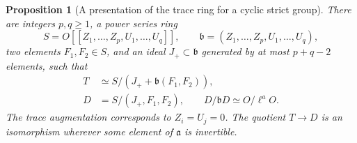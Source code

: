 \documentclass[a4paper,11pt]{article}
\newtheorem{proposition}{Proposition}[section]
\theoremstyle{definition}
\theoremstyle{remark}
\numberwithin{equation}{section}
\begin{document}
\begin{proposition}[A presentation of the trace ring for a cyclic strict group]
\label{prop:cyclictrace397}
There are integers \(p,q\ge1\), a power series ring
\[
 S=O[[Z_1,\ldots,Z_p,U_1,\ldots,U_q]],\qquad
 \mathfrak b=(Z_1,\ldots,Z_p,U_1,\ldots,U_q),
\]
two elements \(F_1,F_2\in S\), and an ideal
\(J_+\subset\mathfrak b\) generated by at most \(p+q-2\)
elements, such that
\[
 \begin{split}
       T&\simeq S/(J_++\mathfrak b(F_1,F_2)),\\
       D&=S/(J_+,F_1,F_2),\qquad
       D/\mathfrak bD\simeq O/\ell^aO .
 \end{split}
\]
The trace augmentation corresponds to \(Z_i=U_j=0\).
The quotient \(T\to D\) is an isomorphism wherever some
element of \(\mathfrak a\) is invertible.
\end{proposition}
\end{document}
